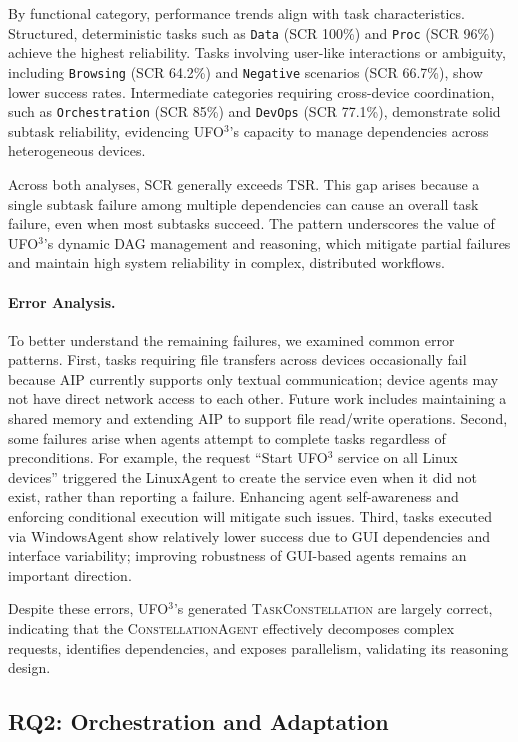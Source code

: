 \documentclass[10pt]{article} %
\newcommand{\ufo}{\textsc{UFO}$^3$\xspace}
\newcommand{\cagent}{\textsc{ConstellationAgent}\xspace}
\newcommand{\TaskConstellation}{\textsc{TaskConstellation}\xspace}
\begin{document}
By functional category, performance trends align with task characteristics. Structured, deterministic tasks such as \texttt{Data} (SCR 100\%) and \texttt{Proc} (SCR 96\%) achieve the highest reliability. Tasks involving user-like interactions or ambiguity, including \texttt{Browsing} (SCR 64.2\%) and \texttt{Negative} scenarios (SCR 66.7\%), show lower success rates. Intermediate categories requiring cross-device coordination, such as \texttt{Orchestration} (SCR 85\%) and \texttt{DevOps} (SCR 77.1\%), demonstrate solid subtask reliability, evidencing \ufo's capacity to manage dependencies across heterogeneous devices.

Across both analyses, SCR generally exceeds TSR. This gap arises because a single subtask failure among multiple dependencies can cause an overall task failure, even when most subtasks succeed. The pattern underscores the value of \ufo's dynamic DAG management and reasoning, which mitigate partial failures and maintain high system reliability in complex, distributed workflows.

\paragraph{Error Analysis.}
To better understand the remaining failures, we examined common error patterns. First, tasks requiring file transfers across devices occasionally fail because AIP currently supports only textual communication; device agents may not have direct network access to each other. Future work includes maintaining a shared memory and extending AIP to support file read/write operations. Second, some failures arise when agents attempt to complete tasks regardless of preconditions. For example, the request ``Start \ufo service on all Linux devices'' triggered the LinuxAgent to create the service even when it did not exist, rather than reporting a failure. Enhancing agent self-awareness and enforcing conditional execution will mitigate such issues. 
Third, tasks executed via WindowsAgent show relatively lower success due to GUI dependencies and interface variability; improving robustness of GUI-based agents remains an important direction. 

Despite these errors, \ufo's generated \TaskConstellation are largely correct, indicating that the \cagent effectively decomposes complex requests, identifies dependencies, and exposes parallelism, validating its reasoning design.



\subsection{RQ2: Orchestration and Adaptation}
\label{subsec:rq2}
\end{document}
